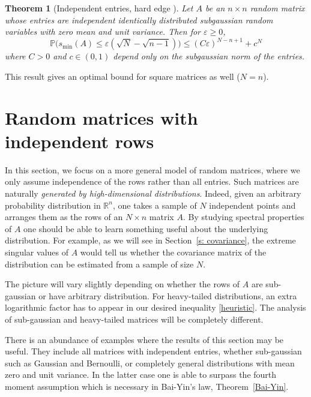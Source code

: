 \documentclass[10pt, openany]{book}
\newtheorem{theorem}{Theorem}[chapter]
\theoremstyle{remark}
\def \R {\mathbb{R}}
\def \P {\mathbb{P}}
\def \e {\varepsilon}
\def \smin {s_{\min}}
\begin{document}
\begin{theorem}[Independent entries, hard edge \cite{RV rectangular}]		
  \label{RV rectangular}
  Let $A$ be an $n \times n$ random matrix whose entries are independent
  identically distributed subgaussian random variables
  with zero mean and unit variance.
  Then for $\e \ge 0$,
  $$
  \P \big( \smin(A) \le \e (\sqrt{N} - \sqrt{n-1}) \big) \le (C\e)^{N-n+1} +  c^N  
  $$
  where $C > 0$  and $c \in (0,1)$ depend only on the subgaussian
  norm of the entries.
\end{theorem}

This result gives an optimal bound for square matrices as well ($N=n$).




\section{Random matrices with independent rows}				\label{s: rows}

In this section, we focus on a more general model of random matrices, where we only 
assume independence of the rows rather than all entries. 
Such matrices are naturally
{\em generated by high-dimensional distributions}.
Indeed, given an arbitrary probability distribution in $\R^n$, one takes
a sample of $N$ independent points and arranges them as the rows of an $N \times n$ matrix $A$.
By studying spectral properties of $A$ one should be able to learn something useful about the 
underlying distribution. For example, as we will see in Section~\ref{s: covariance}, 
the extreme singular values of $A$ would tell us whether the covariance matrix 
of the distribution can be estimated from a sample of size $N$.

The picture will vary slightly depending on whether the rows of $A$ 
are sub-gaussian or have arbitrary distribution. For heavy-tailed distributions, an extra 
logarithmic factor has to appear in our desired inequality \eqref{heuristic}. 
The analysis of sub-gaussian and heavy-tailed matrices will be completely different.

There is an abundance of examples where the results of 
this section may be useful. They include all matrices with independent entries,
whether sub-gaussian such as Gaussian and Bernoulli, or completely general
distributions with mean zero and unit variance. In the latter case
one is able to surpass the fourth moment assumption which is 
necessary in Bai-Yin's law, Theorem~\ref{Bai-Yin}.
\end{document}

